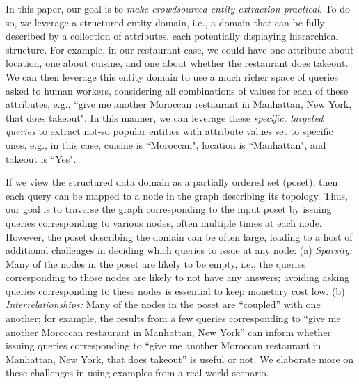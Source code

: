 In this paper, our goal is to {\em make crowdsourced entity extraction practical}. To do so, we leverage a structured entity domain, i.e., a domain that can be fully described by a collection of attributes, each potentially displaying hierarchical structure. For example, in our restaurant case, we could have one attribute about location, one about cuisine, and one about whether the restaurant does takeout. We can then leverage this entity domain to use a much richer space of queries asked to human workers, considering all combinations of values for each of these attributes, e.g., ``give me another Moroccan restaurant in Manhattan, New York, that does takeout".  In this manner, we can leverage these {\em specific, targeted queries} to extract not-so popular entities with attribute values set to specific ones, e.g., in this case, cuisine is ``Moroccan", location is ``Manhattan", and takeout is ``Yes".

If we view the structured data domain as a partially ordered set (poset), then each query can be mapped to a node in the graph describing its topology. Thus, our goal is to traverse the graph corresponding to the input poset by issuing queries corresponding to various nodes, often multiple times at each node. However, the poset describing the domain can be often large, leading to a host of additional challenges in deciding which queries to issue at any node: (a) {\em Sparsity:} Many of the nodes in the poset are likely to be empty, i.e., the queries corresponding to those nodes are likely to not have any answers; avoiding asking queries corresponding to these nodes is essential to keep monetary cost low. (b) {\em Interrelationships:} Many of the nodes in the poset are ``coupled'' with one another; for example, the results from a few queries corresponding to ``give me another Moroccan restaurant in Manhattan, New York'' can inform whether issuing queries corresponding to ``give me another Moroccan restaurant in Manhattan, New York, that does takeout'' is useful or not. We elaborate more on these challenges in  using examples from a real-world scenario.

